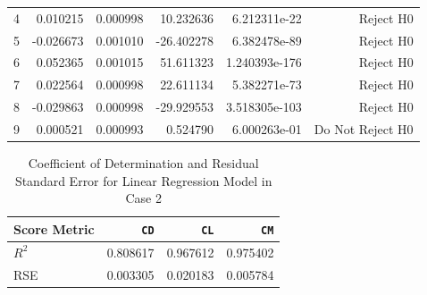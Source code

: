 \documentclass[conf]{new-aiaa}
\begin{document}
\begin{table}[H]
\begin{subtable}{1.0\textwidth}
\begin{tabular}[width=1.0\textwidth]{lrrrrr}
            4 &  0.010215 &        0.000998 &    10.232636 &   6.212311e-22 &              Reject H0 \\
            5 & -0.026673 &        0.001010 &   -26.402278 &   6.382478e-89 &              Reject H0 \\
            6 &  0.052365 &        0.001015 &    51.611323 &  1.240393e-176 &              Reject H0 \\
            7 &  0.022564 &        0.000998 &    22.611134 &   5.382271e-73 &              Reject H0 \\
            8 & -0.029863 &        0.000998 &   -29.929553 &  3.518305e-103 &              Reject H0 \\
            9 &  0.000521 &        0.000993 &     0.524790 &   6.000263e-01 &       Do Not Reject H0 \\
            \bottomrule
        \end{tabular}
    \end{subtable}
\end{table}
\begin{table}[H]
    \centering
    \caption{\label{tab:case2_r2_rse}Coefficient of Determination and Residual Standard Error for Linear Regression Model in Case 2}
    \begin{tabular}[width=1.0/textwidth]{lrrr}
        \toprule
        Score Metric &      \texttt{CD} & \texttt{CL} & \texttt{CM} \\
        \midrule
        $R^2$ &      0.808617 & 0.967612 & 0.975402 \\
        RSE &        0.003305 & 0.020183 & 0.005784 \\
        \bottomrule
    \end{tabular}
\end{table}
\end{document}
